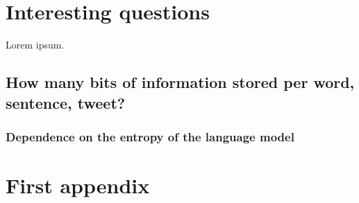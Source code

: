 \documentclass{IIBproject}
\begin{document}
\newpage
\section{Interesting questions}

Lorem ipsum.

\subsection{How many bits of information stored per word, sentence, tweet?}

\subsubsection{Dependence on the entropy of the language model}

\newpage
\footnotesize



\newpage
\appendix

\section{First appendix}
\end{document}
